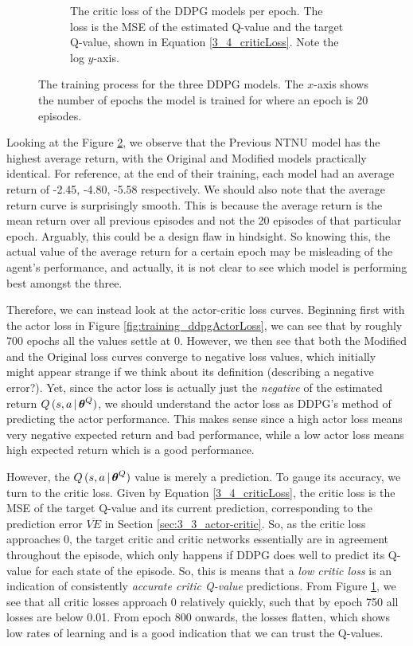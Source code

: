 \begin{figure}[H]
\begin{subfigure}[b]{0.78\textwidth}
         \caption{The critic loss of the DDPG models per epoch. The loss is the MSE of the estimated Q-value and the target Q-value, shown in Equation \eqref{3_4_criticLoss}. Note the log $y$-axis.}
         \label{fig:training_ddpgCriticLoss}
     \end{subfigure}
    \captionsetup{justification=centering}
    \caption{The training process for the three DDPG models. The $x$-axis shows the number of epochs the model is trained for where an epoch is 20 episodes.}
     \label{fig:5_training_DDPG}
\end{figure}
Looking at the Figure \ref{fig:5_training_DDPG}, we observe that the Previous NTNU model has the highest average return, with the Original and Modified models practically identical. For reference, at the end of their training, each model had an average return of -2.45, -4.80, -5.58 respectively.
We should also note that the average return curve is surprisingly smooth. This is because the average return is the mean return over all previous episodes and not the 20 episodes of that particular epoch. Arguably, this could be a design flaw in hindsight. So knowing this, the actual value of the average return for a certain epoch may be misleading of the agent's performance, and actually, it is not clear to see which model is performing best amongst the three. 

Therefore, we can instead look at the actor-critic loss curves. Beginning first with the actor loss in Figure \ref{fig:training_ddpgActorLoss}, we can see that by roughly 700 epochs all the values settle at 0. However, we then see that both the Modified and the Original loss curves converge to negative loss values, which initially might appear strange if we think about its definition (describing a negative error?).
Yet, since the actor loss is actually just the \textit{negative} of the estimated return $Q\,(s,a \,|\, \boldsymbol{\theta}^Q)$, we should understand the actor loss as DDPG's method of predicting the actor performance. This makes sense since a high actor loss means very negative expected return and bad performance, while a low actor loss means high expected return which is a good performance. 

However, the $Q\,(s,a \,|\, \boldsymbol{\theta}^Q)$ value is merely a prediction. To gauge its accuracy, we turn to the critic loss. Given by Equation \eqref{3_4_criticLoss}, the critic loss is the MSE of the target Q-value and its current prediction, corresponding to the prediction error $\overline{VE}$ in Section \ref{sec:3_3_actor-critic}. 
So, as the critic loss approaches 0, the target critic and critic networks essentially are in agreement throughout the episode, which only happens if DDPG does well to predict its Q-value for each state of the episode. So, this is means that a \textit{low critic loss} is an indication of consistently \textit{accurate critic Q-value} predictions.
From Figure \ref{fig:training_ddpgCriticLoss}, we see that all critic losses approach 0 relatively quickly, such that by epoch 750 all losses are below 0.01.
From epoch 800 onwards, the losses flatten, which shows low rates of learning and is a good indication that we can trust the Q-values. 

